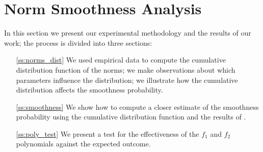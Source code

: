 \documentclass[a4paper, 10pt, envcountsect, runningheads]{lms}
\numberwithin{figure}{section}
\numberwithin{equation}{section}
\begin{document}
\section{Norm Smoothness Analysis}
\label{s:results}
In this section we present our experimental methodology and the results of our work; the process is divided into three sections:
\begin{itemize}
\item[\ref{ss:norms_dist}] We used empirical data to compute the cumulative distribution function of the norms; we make observations about which parameters influence the distribution; we illustrate how the cumulative distribution affects the smoothness probability.

\item[\ref{ss:smoothness}] We show how to compute a closer estimate of the smoothness probability using the cumulative distribution function and the results of \cite{dan_psi_est}.

\item[\ref{ss:poly_test}] We present a test for the effectiveness of the $f_1$ and $f_2$ polynomials against the expected outcome.

\end{itemize}
\end{document}
